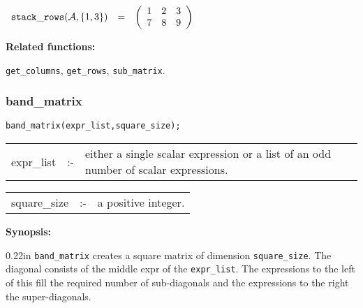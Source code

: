 \vspace*{0.1in}

\begin{flushleft}  
\hspace*{0.1in}
\begin{math}  
\begin{array}{ccc}
{\tt stack\_rows}(\mathcal{A},\{1,3\}) & = & 
\left( \begin{array}{ccc} 1 & 2 & 3 \\ 7 & 8 & 9
\end{array} \right)  
\end{array}  
\end{math}
\end{flushleft}

{\bf Related functions:}

\hspace*{0.175in} {\tt get\_columns}, {\tt get\_rows}, 
{\tt sub\_matrix}.


\subsubsection{band\_matrix}
\label{linalg:band_matrix}

\hspace*{0.175in} {\tt band\_matrix(expr\_list,square\_size);}

\hspace*{0.1in}
\begin{tabular}{l l l}
expr\_list  \hspace*{0.088in} &:-& \parbox[t]{.72\linewidth}
{either a single scalar expression or a list of an odd number of scalar
expressions.} 
\end{tabular}

\vspace*{0.04in}
\hspace*{0.1in}
\begin{tabular}{l l l}
square\_size &:-& a positive integer.
\end{tabular}


{\bf Synopsis:} %

\begin{addtolength}{\leftskip}{0.22in}
                {\tt band\_matrix} creates a square matrix of
                dimension \texttt{square\_size}. The diagonal consists of the
                middle expr of the \texttt{expr\_list}. The expressions to the
                left of this fill the required number of sub-diagonals and the
                expressions to the right the super-diagonals.

\end{addtolength}

